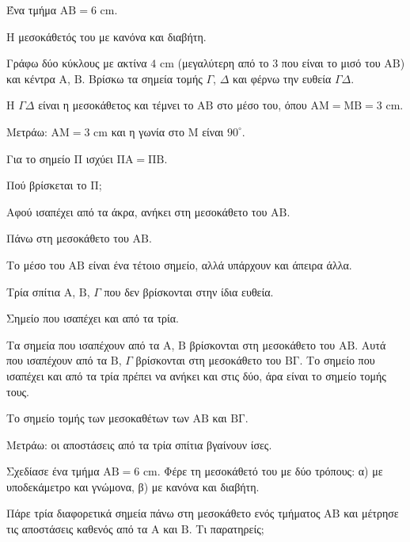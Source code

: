 \tixero Ένα τμήμα $\mathrm{ΑΒ}=6$ cm.\par
\tithelo Η μεσοκάθετός του με κανόνα και διαβήτη.\par
\possindeo Γράφω δύο κύκλους με ακτίνα $4$ cm (μεγαλύτερη από το $3$ που είναι το μισό του $\mathrm{ΑΒ}$) και κέντρα $\mathrm{Α}$, $\mathrm{Β}$. Βρίσκω τα σημεία τομής $\Gamma$, $\Delta$ και φέρνω την ευθεία $\Gamma\Delta$.\par
\apantisi Η $\Gamma\Delta$ είναι η μεσοκάθετος και τέμνει το $\mathrm{ΑΒ}$ στο μέσο του, όπου $\mathrm{ΑΜ}=\mathrm{ΜΒ}=3$ cm.\par
\elegxos Μετράω: $\mathrm{ΑΜ}=3$ cm και η γωνία στο $\mathrm{Μ}$ είναι $90^\circ$.

\tixero Για το σημείο $\mathrm{Π}$ ισχύει $\mathrm{ΠΑ}=\mathrm{ΠΒ}$.\par
\tithelo Πού βρίσκεται το $\mathrm{Π}$;\par
\possindeo Αφού ισαπέχει από τα άκρα, ανήκει στη μεσοκάθετο του $\mathrm{ΑΒ}$.\par
\apantisi Πάνω στη μεσοκάθετο του $\mathrm{ΑΒ}$.\par
\elegxos Το μέσο του $\mathrm{ΑΒ}$ είναι ένα τέτοιο σημείο, αλλά υπάρχουν και άπειρα άλλα.

\tixero Τρία σπίτια $\mathrm{Α}$, $\mathrm{Β}$, $\Gamma$ που δεν βρίσκονται στην ίδια ευθεία.\par
\tithelo Σημείο που ισαπέχει και από τα τρία.\par
\possindeo Τα σημεία που ισαπέχουν από τα $\mathrm{Α}$, $\mathrm{Β}$ βρίσκονται στη μεσοκάθετο του $\mathrm{ΑΒ}$. Αυτά που ισαπέχουν από τα $\mathrm{Β}$, $\Gamma$ βρίσκονται στη μεσοκάθετο του $\mathrm{ΒΓ}$. Το σημείο που ισαπέχει και από τα τρία πρέπει να ανήκει και στις δύο, άρα είναι το σημείο τομής τους.\par
\apantisi Το σημείο τομής των μεσοκαθέτων των $\mathrm{ΑΒ}$ και $\mathrm{ΒΓ}$.\par
\elegxos Μετράω: οι αποστάσεις από τα τρία σπίτια βγαίνουν ίσες.



\ex Σχεδίασε ένα τμήμα $\mathrm{ΑΒ}=6$ cm. Φέρε τη μεσοκάθετό του με δύο τρόπους: α) με υποδεκάμετρο και γνώμονα, β) με κανόνα και διαβήτη.

\ex Πάρε τρία διαφορετικά σημεία πάνω στη μεσοκάθετο ενός τμήματος $\mathrm{ΑΒ}$ και μέτρησε τις αποστάσεις καθενός από τα $\mathrm{Α}$ και $\mathrm{Β}$. Τι παρατηρείς;

